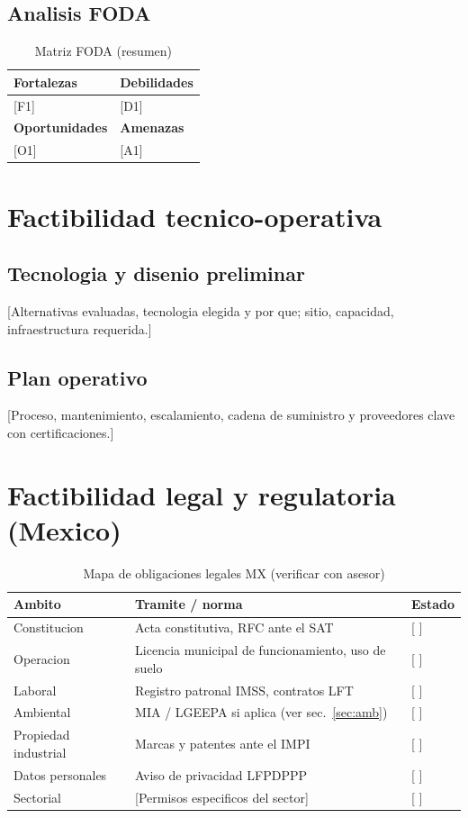 \documentclass[12pt]{article}
\begin{document}
\subsection{Analisis FODA}
\begin{table}[h]
  \centering
  \caption{Matriz FODA (resumen)}
  \begin{tabular}{p{}p{}}
    \toprule
    \textbf{Fortalezas} & \textbf{Debilidades} \\
    \midrule
    {[F1]} & [D1] \\
    \bottomrule
    \textbf{Oportunidades} & \textbf{Amenazas} \\
    \midrule
    {[O1]} & [A1] \\
    \bottomrule
  \end{tabular}
\end{table}

\section{Factibilidad tecnico-operativa}
\subsection{Tecnologia y disenio preliminar}
[Alternativas evaluadas, tecnologia elegida y por que; sitio, capacidad,
infraestructura requerida.]
\subsection{Plan operativo}
[Proceso, mantenimiento, escalamiento, cadena de suministro y proveedores
clave con certificaciones.]

\section{Factibilidad legal y regulatoria (Mexico)}
\begin{table}[h]
  \centering
  \caption{Mapa de obligaciones legales MX (verificar con asesor)}
  \begin{tabular}{p{}p{}p{}}
    \toprule
    \textbf{Ambito} & \textbf{Tramite / norma} & \textbf{Estado} \\
    \midrule
    Constitucion & Acta constitutiva, RFC ante el SAT & [ ] \\
    Operacion & Licencia municipal de funcionamiento, uso de suelo & [ ] \\
    Laboral & Registro patronal IMSS, contratos LFT & [ ] \\
    Ambiental & MIA / LGEEPA si aplica (ver sec.~\ref{sec:amb}) & [ ] \\
    Propiedad industrial & Marcas y patentes ante el IMPI & [ ] \\
    Datos personales & Aviso de privacidad LFPDPPP & [ ] \\
    Sectorial & [Permisos especificos del sector] & [ ] \\
    \bottomrule
  \end{tabular}
\end{table}
\end{document}
